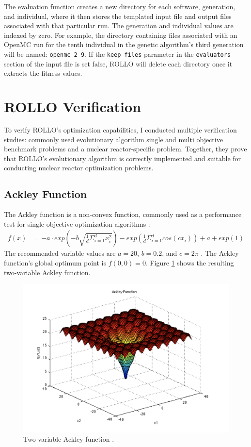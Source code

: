 The evaluation function creates a new directory for each software, generation, 
and individual, where it then stores the templated input file and output files 
associated with that particular run. 
The generation and individual values are indexed by zero. 
For example, the directory containing files associated with an OpenMC run for 
the tenth individual in the genetic algorithm's third generation will be named: 
\texttt{openmc\_2\_9}.
If the \texttt{keep\_files} parameter in the \texttt{evaluators} section of the 
input file is set false, \gls{ROLLO} will delete each directory once it 
extracts the fitness values. 

\section{ROLLO Verification}
To verify \gls{ROLLO}'s optimization capabilities, I conducted multiple verification 
studies: commonly used evolutionary algorithm single and multi objective benchmark problems
and a nuclear reactor-specific problem. 
Together, they prove that \gls{ROLLO}'s evolutionary algorithm is correctly implemented 
and suitable for conducting nuclear reactor optimization problems. 

\subsection{Ackley Function}
The Ackley function is a non-convex function, commonly used as a performance test 
for single-objective optimization algorithms \cite{ackley_connectionist_2012}: 
\begin{align}
    f(x) &= -a \cdot exp \left(-b\sqrt{\frac{1}{d}\Sigma_{i=1}^dx_i^2}\right) - 
    exp \left(\frac{1}{d}\Sigma_{i=1}^d cos(cx_i)\right) + a + exp(1) 
\end{align}
The recommended variable values are $a=20$, $b=0.2$, and $c=2\pi$
\cite{sfu_ackley_nodate}. 
The Ackley function's global optimum point is $f(0,0) = 0$. 
Figure \ref{fig:ackley} shows the resulting two-variable Ackley function.
\begin{figure}[H]
    \centering
    \includegraphics[width=0.65\linewidth]{figures/ackley.png} 
    \caption{Two variable Ackley function \cite{sfu_ackley_nodate}.}
    \label{fig:ackley}
\end{figure}
 

